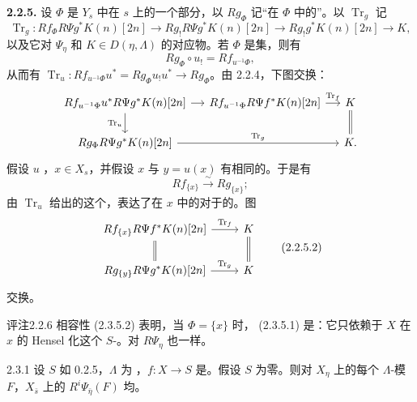 \textbf{2.2.5.} 设 $\Phi$ 是 $Y_s$ 中在 $s$ 上的一个部分，以 $Rg_\Phi$ 记“在 $\Phi$ 中的”。以 $\operatorname{Tr}_g$ 记
\[\operatorname{Tr}_g:Rf_\Phi R\Psi g^*K(n)[2n]\longrightarrow Rg_!R\Psi g^*K(n)[2n]\longrightarrow Rg_!g^*K(n)[2n]\longrightarrow K,\tag{2.2.5.1}\]
以及它对 $\Psi_\eta$ 和 $K\in D(\eta,\Lambda)$ 的对应物。若 $\Phi$ 是集，则有
\[Rg_\Phi\circ u_!=Rf_{u^{-1}\Phi},\]
从而有 $\operatorname{Tr}_u:Rf_{u^{-1}\Phi}u^*=Rg_\Phi u_!u^*\to Rg_\Phi$。由 2.2.4，下图交换：
\[
\begin{tikzcd}[column sep=small]
Rf_{u^{-1}\Phi}u^*R\Psi g^*K(n)[2n]\arrow[r]\arrow[d,"\operatorname{Tr}_u"']&Rf_{u^{-1}\Phi}R\Psi f^*K(n)[2n]\arrow[r,"\operatorname{Tr}_f"]&K\arrow[d,equal]\\
Rg_\Phi R\Psi g^*K(n)[2n]\arrow[rr,"\operatorname{Tr}_g"]&&K.
\end{tikzcd}
\]
假设 $u$ ，$x\in X_s$，并假设 $x$ 与 $y=u(x)$ 有相同的。于是有
\[Rf_{\{x\}}\xrightarrow\sim Rg_{\{x\}};\]
由 $\operatorname{Tr}_u$ 给出的这个，表达了在 $x$ 中的对于的。图
\[
\begin{tikzcd}
Rf_{\{x\}}R\Psi f^*K(n)[2n]\arrow[r,"\operatorname{Tr}_f"]\arrow[d,equal]&K\arrow[d,equal]\\
Rg_{\{y\}}R\Psi g^*K(n)[2n]\arrow[r,"\operatorname{Tr}_g"]&K
\end{tikzcd}\tag{2.2.5.2}
\]
交换。
\begin{SGAresult}{评注}{2.2.6}
相容性 (2.3.5.2) 表明，当 $\Phi=\{x\}$ 时， (2.3.5.1) 是：它只依赖于 $X$ 在 $x$ 的 Hensel 化这个 $S$-。对 $R\Psi_\eta$ 也一样。
\end{SGAresult}
\begin{SGAresult}{}{2.3.1}
设 $S$ 如 0.2.5，$\Lambda$ 为 ，$f:X\to S$ 是。假设 $S$ 为零。则对 $X_\eta$ 上的每个 $\Lambda$-模 $F$，$X_{\bar s}$ 上的 $R^i\Psi_{\bar\eta}(F)$ 均。
\end{SGAresult}
